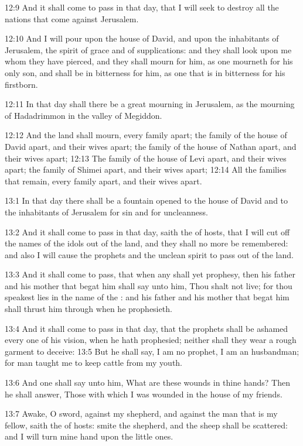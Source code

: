 12:9 And it shall come to pass in that day, that I will seek to destroy all the nations that come against Jerusalem.

12:10 And I will pour upon the house of David, and upon the inhabitants of Jerusalem, the spirit of grace and of supplications: and they shall look upon me whom they have pierced, and they shall mourn for him, as one mourneth for his only son, and shall be in bitterness for him, as one that is in bitterness for his firstborn.

12:11 In that day shall there be a great mourning in Jerusalem, as the mourning of Hadadrimmon in the valley of Megiddon.

12:12 And the land shall mourn, every family apart; the family of the house of David apart, and their wives apart; the family of the house of Nathan apart, and their wives apart; 12:13 The family of the house of Levi apart, and their wives apart; the family of Shimei apart, and their wives apart; 12:14 All the families that remain, every family apart, and their wives apart.

13:1 In that day there shall be a fountain opened to the house of David and to the inhabitants of Jerusalem for sin and for uncleanness.

13:2 And it shall come to pass in that day, saith the \LORD of hosts, that I will cut off the names of the idols out of the land, and they shall no more be remembered: and also I will cause the prophets and the unclean spirit to pass out of the land.

13:3 And it shall come to pass, that when any shall yet prophesy, then his father and his mother that begat him shall say unto him, Thou shalt not live; for thou speakest lies in the name of the \LORD: and his father and his mother that begat him shall thrust him through when he prophesieth.

13:4 And it shall come to pass in that day, that the prophets shall be ashamed every one of his vision, when he hath prophesied; neither shall they wear a rough garment to deceive: 13:5 But he shall say, I am no prophet, I am an husbandman; for man taught me to keep cattle from my youth.

13:6 And one shall say unto him, What are these wounds in thine hands?  Then he shall answer, Those with which I was wounded in the house of my friends.

13:7 Awake, O sword, against my shepherd, and against the man that is my fellow, saith the \LORD of hosts: smite the shepherd, and the sheep shall be scattered: and I will turn mine hand upon the little ones.

